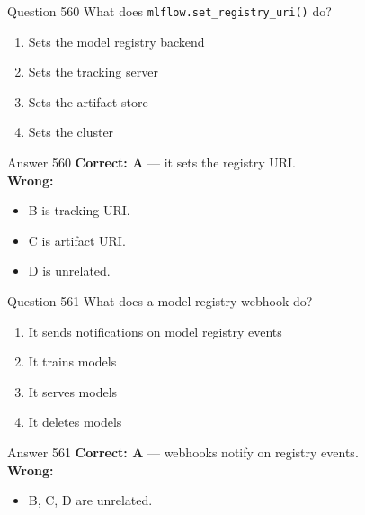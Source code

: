 \documentclass[aspectratio=169,11pt]{beamer}
\begin{document}
	\begin{frame}{Question 560}
		What does \texttt{mlflow.set\_registry\_uri()} do?
		\begin{enumerate}[label=\Alph*.]
			\item Sets the model registry backend
			\item Sets the tracking server
			\item Sets the artifact store
			\item Sets the cluster
		\end{enumerate}
	\end{frame}
	\begin{frame}{Answer 560}
		\textbf{Correct: A} --- it sets the registry URI.\\
		\vspace{0.5em}
		\textbf{Wrong:}
		\begin{itemize}
			\item B is tracking URI.
			\item C is artifact URI.
			\item D is unrelated.
		\end{itemize}
	\end{frame}
	
	\begin{frame}{Question 561}
		What does a model registry webhook do?
		\begin{enumerate}[label=\Alph*.]
			\item It sends notifications on model registry events
			\item It trains models
			\item It serves models
			\item It deletes models
		\end{enumerate}
	\end{frame}
	\begin{frame}{Answer 561}
		\textbf{Correct: A} --- webhooks notify on registry events.\\
		\vspace{0.5em}
		\textbf{Wrong:}
		\begin{itemize}
			\item B, C, D are unrelated.
		\end{itemize}
	\end{frame}
	
\end{document}
